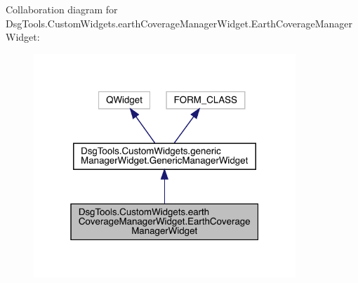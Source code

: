 Collaboration diagram for Dsg\+Tools.\+Custom\+Widgets.\+earth\+Coverage\+Manager\+Widget.\+Earth\+Coverage\+Manager\+Widget\+:
\nopagebreak
\begin{figure}[H]
\begin{center}
\leavevmode
\includegraphics[width=280pt]{class_dsg_tools_1_1_custom_widgets_1_1earth_coverage_manager_widget_1_1_earth_coverage_manager_widget__coll__graph}
\end{center}
\end{figure}

